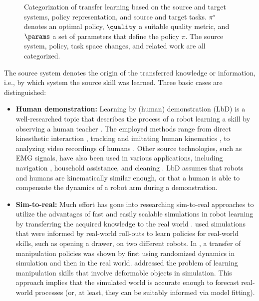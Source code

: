 \begin{figure*}[ht!]
    
    \caption{Categorization of transfer learning based on the source and target systems, policy representation, and source and target tasks. $\pi^\star$ denotes an optimal policy, $\quality$ a suitable quality metric, and $\params$ a set of parameters that define the policy $\pi$. The source system, policy, task space changes, and related work are all categorized.}
    \label{fig:introduction:related:transfer}
\end{figure*}

The source system denotes the origin of the transferred knowledge or information, i.e., by which system the source skill was learned.
Three basic cases are distinguished:
\begin{itemize}
\item \textbf{Human demonstration:} Learning by (human) demonstration (LbD) is a well-researched topic that describes the process of a robot learning a skill by observing a human teacher \cite{Argall.2009,Konidaris.2012,Zhu.2018,Chernova.2014,Ravichandar.2020}.
    The employed methods range from direct kinesthetic interaction \cite{Kronander.2014,AbuDakka.2018}, tracking and imitating human kinematics \cite{Hueser.2006}, to analyzing video recordings of humans \cite{YezhouYang.2015}.
    Other source technologies, such as EMG signals, have also been used in \cite{Yang.2018} various applications, including navigation \cite{Wigness.2018}, household assistance, \cite{Pignat.2017} and cleaning \cite{Kim.2018}.
    LbD assumes that robots and humans are kinematically similar enough, or that a human is able to compensate the dynamics of a robot arm during a demonstration.
    \item \textbf{Sim-to-real:} Much effort has gone into researching sim-to-real approaches to utilize the advantages of fast and easily scalable simulations in robot learning by transferring the acquired knowledge to the real world \cite{JeroenvanBaar.2018,BeltranHernandez.2020,Nguyen.2018,Rusu.2017,Golemo.2018}.
    \cite{Chebotar.2019} used simulations that were informed by real-world roll-outs to learn policies for real-world skills, such as opening a drawer, on two different robots.
    In \cite{Peng.2018}, a transfer of manipulation policies was shown by first using randomized dynamics in simulation and then in the real world. \cite{Matas.2018} addressed the problem of learning manipulation skills that involve deformable objects in simulation.
    This approach implies that the simulated world is accurate enough to forecast real-world processes (or, at least, they can be suitably informed via model fitting).

\end{itemize}
